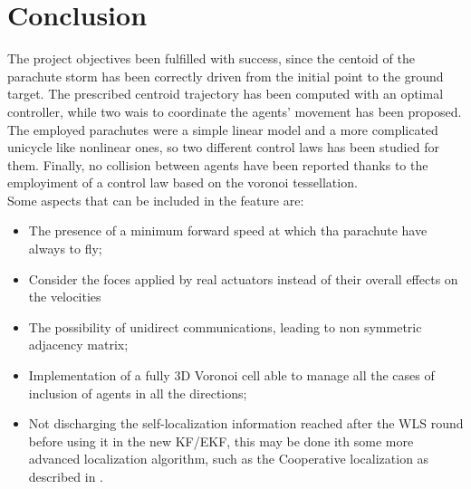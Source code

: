 \section{Conclusion}
The project objectives been fulfilled with success, since the centoid of the parachute storm has been correctly driven from the initial point to the ground target. The prescribed centroid trajectory has been computed with an optimal controller, while two wais to coordinate the agents' movement has been proposed. The employed parachutes were a simple linear model and a more complicated unicycle like nonlinear ones, so two different control laws has been studied for them. Finally, no collision between agents have been reported thanks to the employiment of a control law based on the voronoi tessellation. \\
Some aspects that can be included in the feature are:
\begin{itemize}
    \item The presence of a minimum forward speed at which tha parachute have always to fly;
    \item Consider the foces applied by real actuators instead of their overall effects on the velocities
    \item The possibility of unidirect communications, leading to non symmetric adjacency matrix; 
    \item Implementation of a fully 3D Voronoi cell able to manage all the cases of inclusion of agents in all the directions;
    \item Not discharging the self-localization information reached after the WLS round before using it in the new KF/EKF, this may be done ith some more advanced localization algorithm, such as the Cooperative localization as described in \cite{b14}.
\end{itemize}